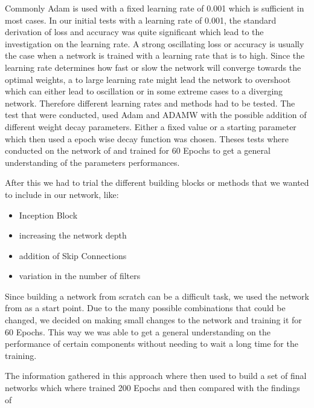 \documentclass[
a4paper, 
12pt,
grayscalebody, %
abstract=on,
twoside, BCOR10mm, 12pt, DIV13,headinclude, footexclude, final, abstracton, openright
]{ibireprt}
\numberwithin{equation}{chapter}
\numberwithin{table}{chapter}
\numberwithin{figure}{chapter}
\numberwithin{algorithm}{chapter}
\numberwithin{example}{chapter}
\numberwithin{example}{chapter}
\begin{document}
Commonly Adam is used with a fixed learning rate of 0.001 which is sufficient in most cases. In our initial tests with a learning rate of 0.001, the standard derivation of loss and accuracy was quite significant which lead to the investigation on the learning rate. A strong oscillating loss or accuracy is usually the case when a network is trained with a learning rate that is to high. Since the learning rate determines how fast or slow the network will converge towards the optimal weights, a to large learning rate might lead the network to overshoot which can either lead to oscillation or in some extreme cases to a diverging network. Therefore different learning rates and methods had to be tested. The test that were conducted, used Adam and ADAMW with the possible addition of different weight decay parameters. Either a fixed value or a starting parameter which then used a epoch wise decay function was chosen. Theses tests where conducted on the network of \cite{Walle2023} and trained for 60 Epochs to get a general understanding of the parameters performances.



After this we had to trial the different building blocks or methods that we wanted to include in our network, like:

\begin{itemize}
	\item Inception Block 
	\item increasing the network depth
	\item addition of Skip Connections
	\item variation in the number of filters
\end{itemize}

Since building a network from scratch can be a difficult task, we used the network from \cite{Walle2023} as a start point.  Due to the many possible combinations that could be changed, we decided on making small changes to the network and training it for 60 Epochs. This way we was able to get a general understanding on the performance of certain components without needing to wait a long time for the training. 

The information gathered in this approach where then used to build a set of final networks which where trained 200 Epochs and then compared with the findings of \cite{Walle2023}


\end{document}

